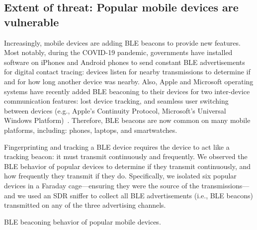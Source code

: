 \subsection{Extent of threat: Popular mobile devices are vulnerable} %


Increasingly,  mobile devices are adding BLE beacons to
provide new features.
%
Most notably, during the COVID-19 pandemic, governments have installed software
on iPhones and Android phones to send constant BLE advertisements for digital
contact tracing: devices listen for nearby transmissions to determine if and
for how long another device was nearby.
%
Also, Apple and Microsoft operating systems have recently added BLE beaconing
to their devices for two inter-device communication features: lost device
tracking, and seamless user switching between devices (e.g., Apple's Continuity
Protocol, Microsoft's Universal Windows
Platform)~\cite{Iphonetracking_becker}.
%
Therefore, BLE beacons are now common on many mobile platforms, including:
phones, laptops, and smartwatches. 
 
 
%

Fingerprinting and tracking a BLE device requires the device to act like a
tracking beacon: it must transmit continuously and frequently.
%
%
We observed the BLE behavior of popular devices to determine if they transmit
continuously, and how frequently they transmit if they do.
%
Specifically, we isolated six popular devices in a Faraday
cage---ensuring they were the source of the transmissions---and we used an SDR sniffer
to collect all BLE advertisements (i.e., BLE beacons) transmitted on any of the three advertising channels.

\begin{table}
    \centering\small
    
    \caption{BLE beaconing behavior of popular mobile devices.}
    \label{tab:beacon_rate}
\end{table}

